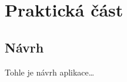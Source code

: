 \part{Praktická část}

\hypertarget{nuxe1vrh}{%
\chapter{Návrh}\label{nuxe1vrh}}

Tohle je návrh aplikace\ldots{}
